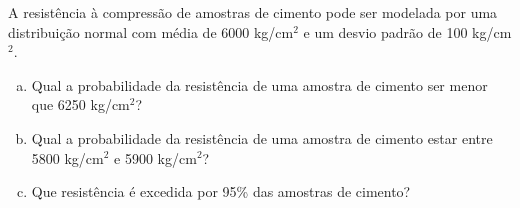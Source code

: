 %
%


\begin{exercicioBanco}[\valorquestao]
A resistência à compressão de amostras de cimento pode ser modelada por uma distribuição normal com média de 6000 kg/cm\(^{2}\) e um desvio padrão de 100 kg/cm\(^{2}\).
%
\begin{enumerate}[(a)]
    \item Qual a probabilidade da resistência de uma amostra de cimento ser menor que 6250 kg/cm\(^{2}\)?
    \item Qual a probabilidade da resistência de uma amostra de cimento estar entre 5800 kg/cm\(^{2}\) e 5900 kg/cm\(^{2}\)?
    \item Que resistência é excedida por 95\% das amostras de cimento?
\end{enumerate}
%
\end{exercicioBanco}

